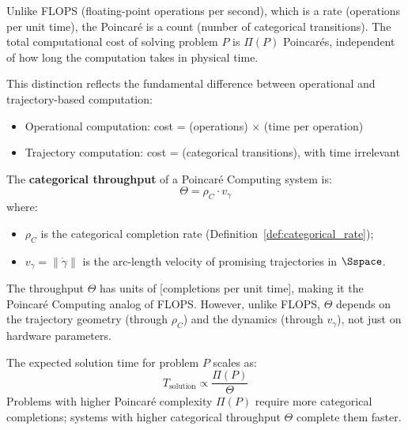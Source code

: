 \begin{remark}
\label{rem:poincare_vs_flops}
Unlike FLOPS (floating-point operations per second), which is a rate (operations per unit time), the Poincaré is a count (number of categorical transitions). The total computational cost of solving problem $P$ is $\Pi(P)$ Poincarés, independent of how long the computation takes in physical time.

This distinction reflects the fundamental difference between operational and trajectory-based computation:
\begin{itemize}
    \item Operational computation: cost = (operations) × (time per operation)
    \item Trajectory computation: cost = (categorical transitions), with time irrelevant
\end{itemize}
\end{remark}

\begin{definition}
\label{def:categorical_throughput}
The \textbf{categorical throughput} of a Poincaré Computing system is:
\begin{equation}
\Theta = \rho_C \cdot v_\gamma
\label{eq:categorical_throughput}
\end{equation}
where:
\begin{itemize}
    \item $\rho_C$ is the categorical completion rate (Definition~\ref{def:categorical_rate});
    \item $v_\gamma = \|\dot{\gamma}\|$ is the arc-length velocity of promising trajectories in $\Sspace$.
\end{itemize}

The throughput $\Theta$ has units of [completions per unit time], making it the Poincaré Computing analog of FLOPS. However, unlike FLOPS, $\Theta$ depends on the trajectory geometry (through $\rho_C$) and the dynamics (through $v_\gamma$), not just on hardware parameters.
\end{definition}

\begin{proposition}
\label{prop:throughput_complexity}
The expected solution time for problem $P$ scales as:
\begin{equation}
T_{\text{solution}} \propto \frac{\Pi(P)}{\Theta}
\label{eq:solution_time}
\end{equation}
Problems with higher Poincaré complexity $\Pi(P)$ require more categorical completions; systems with higher categorical throughput $\Theta$ complete them faster.
\end{proposition}

